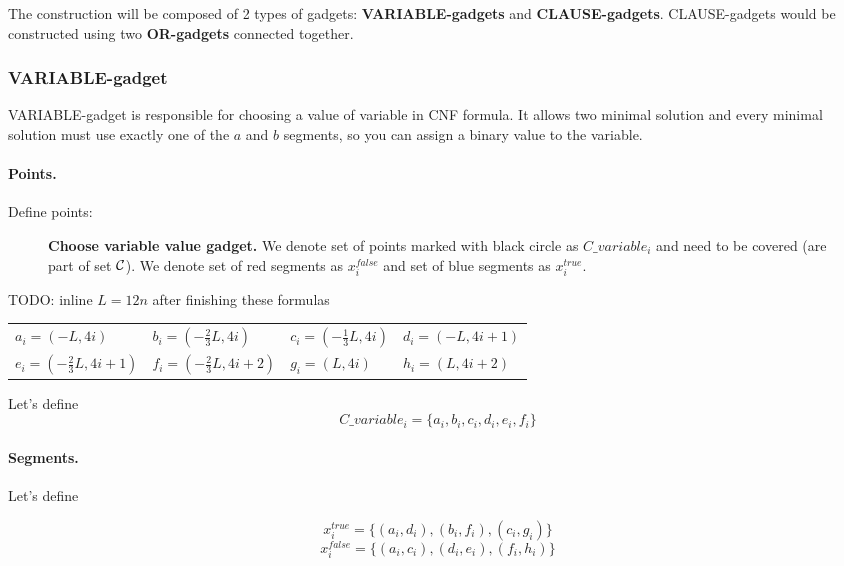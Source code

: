 The construction will be composed of 2 types of gadgets:
\textbf{VARIABLE-gadgets} and \textbf{CLAUSE-gadgets}.
CLAUSE-gadgets would be constructed using two \textbf{OR-gadgets}
connected together.


\subsubsection{VARIABLE-gadget}

VARIABLE-gadget is responsible for choosing a value of variable
in CNF formula. It allows two minimal solution
and every minimal solution must use exactly one of the $a$ and $b$
segments, so you can assign  a binary value to the variable.

\paragraph{Points.}

Define points:
\begin{figure}[h]
\centering
\def\svgwidth{0.5\columnwidth}

\caption{\textbf{Choose variable value gadget.}
We denote set of points marked with black circle as $C\_variable_i$
and need to be covered (are part of set $\mathcal{C}$).
We denote set of red segments as $x^{false}_i$
and set of blue segments as $x^{true}_i$.}
\label{fig:apx_choose_variable}
\end{figure}

TODO: inline $L = 12n$ after finishing these formulas

\begin{center}
\begin{tabular}{ l l l l}
	$a_{i} = (-L, 4i)$ &
	$b_{i} = (-\frac{2}{3}L, 4i)$ & 
	$c_{i} = (-\frac{1}{3}L, 4i)$ & 
	$d_{i} = (-L, 4i+1)$ \\  
	$e_{i} = (-\frac{2}{3}L, 4i+1)$ & 
	$f_{i} = (-\frac{2}{3}L, 4i+2)$ &
	$g_i = (L, 4i)$ &
	$h_i = (L, 4i+2)$
\end{tabular}
\end{center}

Let's define $$C\_variable_i =  \{a_i, b_i, c_i, d_i, e_i, f_i\}$$	


\paragraph{Segments.}

Let's define 

$$x^{true}_i =\{ (a_i, d_i), (b_i, f_i), (c_i, g_i)\}$$
$$x^{false}_i = \{(a_i, c_i), (d_i, e_i), (f_i, h_i)\}$$

